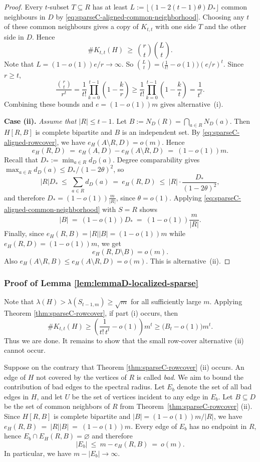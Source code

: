 \documentclass[10pt,a4paper]{amsart}
\newcommand{\Ktt}{K_{t,t}}
\begin{document}
\begin{proof}
Every $t$-subset $T\subseteq R$ has at least
$L:=\lfloor (1-2(t-1)\theta)D_\ast\rfloor$ common neighbours in $D$ by \eqref{eq:sparseC-aligned-common-neighborhood}. 
Choosing any \(t\) of these common neighbours gives a copy of \(\Ktt\) with one side \(T\) and the other side in \(D\). Hence
\[
  \texttt{\#}\Ktt(H)\ \ge\ \binom{r}{t}\binom{L}{t}.
\]
Note that $L=(1-o(1))e/r\to\infty$. So $\binom{L}{t}=\bigl(\frac{1}{t!}-o(1)\bigr)(e/r)^t$.
Since $r\ge t$,
\[
  \frac{\binom{r}{t}}{r^t}
  =
  \frac{1}{t!}\prod_{k=0}^{t-1}\left(1-\frac{k}{r}\right)
  \ge \frac{1}{t!}\prod_{k=0}^{t-1}\left(1-\frac{k}{t}\right)
  =
  \frac{1}{t^t}.
\]
Combining these bounds and $e=(1-o(1))m$ gives alternative~\rm(i).

\smallskip
\noindent
{\bf  Case (ii).} 
\emph{Assume that $|R|\le t-1$.}
Let $B:=N_D(R)=\bigcap_{a\in R}N_D(a)$.
Then $H[R,B]$ is complete bipartite and $B$ is an independent set. 
By \eqref{eq:sparseC-aligned-rowcover}, we have $e_H(A\setminus R,D)=o(m)$. Hence
\[
  e_H(R,D)\ =\ e_H(A,D)-e_H(A\setminus R,D)\ =\ (1-o(1))m.
\]
Recall that $D_\ast:=\min_{a\in R}d_D(a)$.
Degree comparability gives $\max_{a\in R}d_D(a)\le D_\ast/(1-2\theta)^2$, so
\[
  |R| D_\ast\ \le\ \sum_{a\in R}d_D(a)\ =\ e_H(R,D)\ \le\ |R| \cdot \frac{D_\ast}{(1-2\theta)^2},
\]
and therefore $D_\ast=(1-o(1)) \frac{m}{|R|}$, since $\theta=o(1)$.
Applying \eqref{eq:sparseC-aligned-common-neighborhood} with $S=R$ shows
\[
  |B|\ =\ (1-o(1))D_\ast\ =\ (1-o(1))\frac{m}{|R|}.
\]
Finally, since $e_H(R,B)=|R||B|=(1-o(1))m$ while $e_H(R,D)=(1-o(1))m$, we get
\[
        e_H(R,D\setminus B)=o(m).
\]
Also $e_H(A\setminus R,B)\le e_H(A\setminus R,D)=o(m)$.
This is alternative~\rm(ii).
\end{proof}


\subsubsection{Proof of Lemma \ref{lem:lemmaD-localized-sparse}}
\label{sec:4-5-2}

Note that $\lambda(H)>\lambda(S_{t-1,m}) \ge \sqrt{m}$ for all sufficiently large \(m\). 
Applying Theorem \ref{thm:sparseC-rowcover}, 
if part \textup{(i)} occurs, then
\[
\texttt{\#}\Ktt(H)
     \ge 
    \left(\frac{1}{t!\,t^t}-o(1)\right) m^t
    \ge \big( B_t-o(1) \big) m^t.
\]
Thus we are done. It remains to show that the small row-cover alternative \textup{(ii)} cannot occur.

Suppose on the contrary that Theorem \ref{thm:sparseC-rowcover} \textup{(ii)} occurs. 
An edge of $H$ not covered by the vertices of $R$ is called {\it bad}. We aim to bound the contribution of bad edges to the spectral radius. 
Let $E_b$ denote the set of all bad edges in $H$, and let $U$ be the set of vertices incident to any edge in $E_b$. 
Let $B\subseteq D$ be the set of common neighbors of $R$ from
Theorem~\ref{thm:sparseC-rowcover} \textup{(ii)}.
Since $H[R,B]$ is complete bipartite and $|B|=(1-o(1))m/|R|$, we have $e_H(R,B)\ =\ |R||B|\ =\ (1-o(1))m.$ Every edge of $E_b$ has no endpoint in $R$, hence $E_b \cap E_H(R,B)=\varnothing$ and therefore
\[
 |E_b|\ \le\ m-e_H(R,B)\ =\ o(m).
\]
In particular, we have $m-|E_b|\to\infty$.
\end{document}
